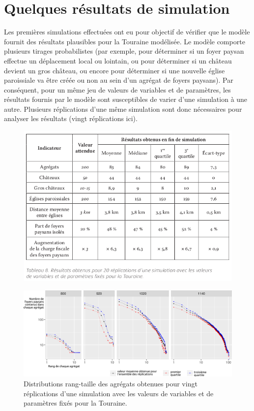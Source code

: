 \documentclass[12pt, a4paper, oneside]{book}
\begin{document}
	
	\section{Quelques résultats de simulation}
	
	Les premières simulations effectuées ont eu pour objectif de vérifier que le modèle fournit des résultats plausibles pour la Touraine modélisée.
	Le modèle comporte plusieurs tirages probabilistes (par exemple, pour déterminer si un foyer paysan effectue un déplacement local ou lointain, ou pour déterminer si un château devient un gros château, ou encore pour déterminer si une nouvelle église paroissiale va être créée ou non au sein d'un agrégat de foyers paysans).
	Par conséquent, pour un même jeu de valeurs de variables et de paramètres, les résultats fournis par le modèle sont susceptibles de varier d'une simulation à une autre.
	Plusieurs réplications d'une même simulation sont donc nécessaires pour analyser les résultats (vingt réplications ici).
	
	\begin{figure}[H]
		\centering
		\includegraphics[width=1\linewidth]{src/Chapitre_TMD/Tab8.png}
	\end{figure}
	
	\begin{figure}[!h]
		\centering
		\includegraphics[width=1\linewidth]{src/Chapitre_TMD/Fig6}
		\caption{Distributions rang-taille des agrégats obtenues pour vingt réplications d'une simulation avec les valeurs de variables et de paramètres fixés pour la Touraine.}
		\label{fig:fig6}
	\end{figure}
	
\end{document}

